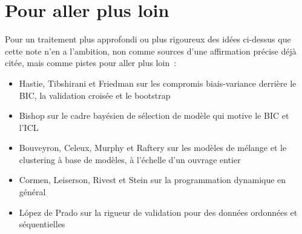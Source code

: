 \documentclass[11pt]{article}
\begin{document}
\section*{Pour aller plus loin}

Pour un traitement plus approfondi ou plus rigoureux des idées ci-dessus
que cette note n'en a l'ambition, non comme sources d'une affirmation
précise déjà citée, mais comme pistes pour aller plus loin~:

\begin{itemize}[leftmargin=*]
\item Hastie, Tibshirani et Friedman sur les compromis biais-variance
  derrière le BIC, la validation croisée et le bootstrap
  \citeyearpar{hastie2009esl}
\item Bishop sur le cadre bayésien de sélection de modèle qui motive le BIC
  et l'ICL \citeyearpar{bishop2006prml}
\item Bouveyron, Celeux, Murphy et Raftery sur les modèles de mélange et le
  clustering à base de modèles, à l'échelle d'un ouvrage entier
  \citeyearpar{bouveyron2021mbc}
\item Cormen, Leiserson, Rivest et Stein sur la programmation dynamique en
  général \citeyearpar{cormen2022algorithms}
\item L\'opez de Prado sur la rigueur de validation pour des données
  ordonnées et séquentielles \citeyearpar{lopezdeprado2018financial}
\end{itemize}

\clearpage


\end{document}
